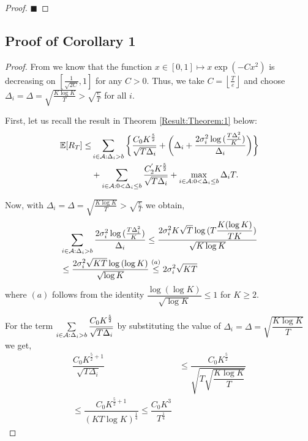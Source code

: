 \begin{proof}
\hfill $\blacksquare$	
\end{proof}

\subsection{Proof of Corollary 1}
\label{App:Corollary:1}
\begin{proof}
\label{Proof:Corollary:1}
From \cite{bubeck2011pure}  we know that the function $x\in [0,1]\mapsto x\exp(-Cx^2)$ is  decreasing on $\left[\frac{1}{\sqrt{2C}},1\right ]$ for any $C>0$. Thus, we take $C=\left\lfloor \frac{T}{e}\right\rfloor$ and choose  $\Delta_{i}=\Delta=\sqrt{\frac{K\log K}{T}}>\sqrt{\frac{e}{T}}$ for all $i$.

First, let us recall the result in Theorem \ref{Result:Theorem:1} below:
\begin{align*}
\mathbb{E} [R_{T}] \leq &\sum\limits_{i\in \mathcal{A} :\Delta_{i} > b}\bigg\lbrace \dfrac{C_0 K^{\frac{5}{2}}}{\sqrt{T\Delta_i}} + \bigg(\Delta_{i}+\dfrac{2\sigma_i^2\log{(\frac{T\Delta_{i}^{2}}{K})}}{\Delta_{i}}\bigg)\bigg \rbrace\\ 
  & +\sum\limits_{i\in \mathcal{A} :0 < \Delta_{i}\leq b} \dfrac{C_2^{'} K^{\frac{5}{2}}}{\sqrt{T\Delta_i}} + \max_{i\in \mathcal{A} :0 < \Delta_{i}\leq b}\Delta_{i}T.
\end{align*}

Now,  with  $\Delta_i =\Delta = \sqrt{\frac{K\log K}{T}}>\sqrt{\frac{e}{T}}$ we obtain,
	\begin{align*}
	&\sum_{i\in \mathcal{A} :\Delta_{i} > b}\dfrac{2\sigma_i^2\log{(\frac{T\Delta_{i}^{2}}{K})}}{\Delta_{i}} \leq  \dfrac{2\sigma_i^2 K\sqrt{T}\log{(T\dfrac{K(\log K)}{T K})}}{\sqrt{K\log K}}\\ 
	&\leq  \dfrac{2\sigma_i^2\sqrt{KT}\log{(\log K)}}{\sqrt{\log K}}
	\overset{(a)}{\leq} 2\sigma_i^2\sqrt{KT} 
	\end{align*}		
	where $(a)$ follows from the identity $\dfrac{\log{(\log K)}}{\sqrt{\log K}}\leq 1$ for $K\geq 2$. 
	
For the term $\sum\limits_{i\in \mathcal{A} :\Delta_{i} > b}\dfrac{C_0 K^{\frac{5}{2}}}{\sqrt{T\Delta_i}}$ by substituting the value of $\Delta_i=\Delta=\sqrt{\dfrac{K\log K}{T}}$ we get,
\begin{align*}
\dfrac{C_0 K^{\frac{5}{2}+1}}{\sqrt{T\Delta_i}} &\leq \dfrac{C_0 K^{\frac{5}{2}}}{\sqrt{T\sqrt{\dfrac{K\log K}{T}}}} \\
\leq \dfrac{C_0 K^{\frac{5}{2}+1}}{(KT\log K)^{\frac{1}{4}}} \leq \dfrac{C_0 K^3}{T^{\frac{1}{4}}}
\end{align*}	
	

\end{proof}

